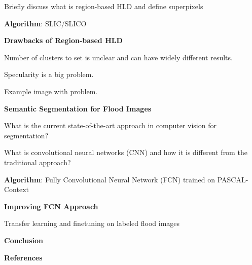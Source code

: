 \documentclass{report}
\begin{document}
\begin{outline}
\begin{outline}
\begin{outline}
			    \begin{outline}
			    	\item Briefly discuss what is region-based HLD and define superpixels
				\item {\bf Algorithm}: SLIC/SLICO
			    \end{outline}
			    \item {\bf Drawbacks of Region-based HLD}
			    \begin{outline}
			    	\item Number of clusters to set is unclear and can have widely different results.
				\item Specularity is a big problem.
				\item Example image with problem.
			    \end{outline}
			    \item {\bf Semantic Segmentation for Flood Images}
			    \begin{outline}
			    	\item What is the current state-of-the-art approach in computer vision for segmentation?
				\item What is convolutional neural networks (CNN) and how it is different from the 						  traditional approach?
				\item {\bf Algorithm}: Fully Convolutional Neural Network (FCN) trained on PASCAL-Context
			    \end{outline}
			    \item {\bf Improving FCN Approach}
			    \begin{outline}
			    	\item Transfer learning and finetuning on labeled flood images
			    \end{outline}
		\end{outline}
    \end{outline}
    \item {\bf Conclusion}
    \item {\bf References}
\end{outline}
\end{document}
